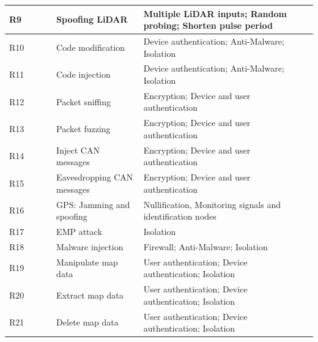 \documentclass[runningheads]{llncs}
\begin{document}
\begin{table}[h!]
{\begin{tabular}{|l|l|l|l|l|}
R9  & ~\cite{MapleEtAl2019}~\cite{ThingEtAL2016}~\cite{PetitEtAl2015} & Spoofing LiDAR & Multiple LiDAR inputs; Random probing; Shorten pulse period &~\cite{YanEtAl2016}~\cite{PetitEtAl2015}  \\ \hline
R10 &~\cite{ThingEtAL2016} & Code modification & Device authentication; Anti-Malware; Isolation & ~\cite{ThingEtAL2016}~\cite{ScalasEtAl2019}  \\ \hline
R11 &~\cite{ThingEtAL2016} & Code injection & Device authentication; Anti-Malware; Isolation &~\cite{ThingEtAL2016}~\cite{ScalasEtAl2019} \\ \hline
R12 &~\cite{ThingEtAL2016}~\cite{ScalasEtAl2019} & Packet sniffing & Encryption; Device and user authentication &~\cite{ThingEtAL2016}~\cite{ScalasEtAl2019} \\ \hline
R13 &~\cite{MapleEtAl2019}~\cite{ThingEtAL2016} ~\cite{ScalasEtAl2019} & Packet fuzzing & Encryption; Device and user authentication &~\cite{ThingEtAL2016}~\cite{ScalasEtAl2019} \\ \hline
R14 & ~\cite{PetitEtAl2014} & Inject CAN messages & Encryption; Device and user authentication &~\cite{ThingEtAL2016}~\cite{ScalasEtAl2019}  \\ \hline
R15 &~\cite{MapleEtAl2019}~\cite{PetitEtAl2014} & Eavesdropping CAN messages & Encryption; Device and user authentication &~\cite{ThingEtAL2016}~\cite{ScalasEtAl2019}\\ \hline
R16 & ~\cite{MapleEtAl2019,PetitEtAl2014,parkinson2017cyber} & GPS: Jamming and spoofing  & Nullification, Monitoring signals and identification nodes & ~\cite{ThingEtAL2016,o2013real} \\ \hline
R17 &~\cite{PetitEtAl2014}& EMP attack & Isolation &~\cite{ThingEtAL2016}~\cite{ScalasEtAl2019} \\ \hline
R18 &~\cite{PetitEtAl2014} & Malware injection & Firewall; Anti-Malware; Isolation & ~\cite{ThingEtAL2016} \\ \hline
R19 & ~\cite{MapleEtAl2019}~\cite{PetitEtAl2014} & Manipulate map data & User authentication; Device authentication; Isolation &~\cite{ThingEtAL2016}~\cite{ScalasEtAl2019} \\ \hline
R20 &~\cite{MapleEtAl2019} & Extract map data & User authentication; Device authentication; Isolation &~\cite{ThingEtAL2016}~\cite{ScalasEtAl2019} \\ \hline
R21 &~\cite{MapleEtAl2019} & Delete map data & User authentication; Device authentication; Isolation &\cite{ThingEtAL2016}~\cite{ScalasEtAl2019}  \\ \hline

\end{tabular}}
\end{table}
\end{document}
